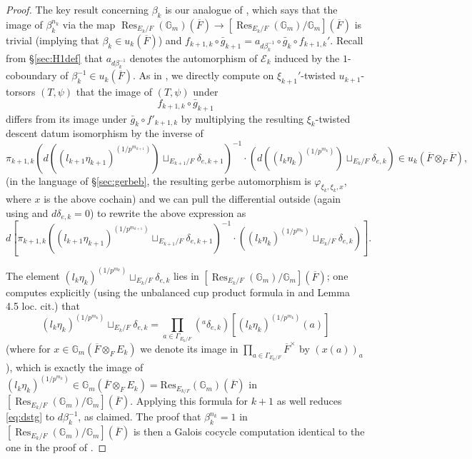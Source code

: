 \documentclass{amsart}
\theoremstyle{definition}
\theoremstyle{remark}
\DeclareMathOperator\Res{Res}
\newcommand{\ov}{\overline}
\begin{document}
\begin{proof}
The key result concerning $\beta_{k}$ is our analogue of \cite[Lemma 5.9]{Kal26b}, which says that the image of $\beta_{k}^{n_{k}}$ via the map $\Res_{E_{k}/F}(\mathbb{G}_{m})(\ov{F}) \to [\Res_{E_{k}/F}(\mathbb{G}_{m})/\mathbb{G}_{m}](\ov{F})$ is trivial (implying that $\beta_{k} \in u_{k}(\ov{F})$) and $f_{k+1,k} \circ \bar{g}_{k+1} = a_{d\beta_{k}^{-1}} \circ \bar{g}_{k} \circ f_{k+1,k}'$. Recall from \S \ref{sec:H1def} that $a_{d\beta_{k}^{-1}}$ denotes the automorphism of $\mathcal{E}_{k}$ induced by the $1$-coboundary of $\beta_{k}^{-1} \in u_{k}(\ov{F})$. As in \cite{Kal26b}, we directly compute on $\xi_{k+1}'$-twisted $u_{k+1}$-torsors $(T,\psi)$ that the image of $(T,\psi)$ under
\begin{equation*}
    f_{k+1,k} \circ \bar{g}_{k+1}
\end{equation*}
differs from its image under $\bar{g}_{k} \circ f'_{k+1,k}$ by multiplying the resulting $\xi_{k}$-twisted descent datum isomorphism by the inverse of
\begin{equation*}
\pi_{k+1,k}(d((l_{k+1}\eta_{k+1})^{(1/p^{m_{k+1}})}) \sqcup_{E_{k+1}/F} \delta_{e,k+1})^{-1} \cdot (d((l_{k}\eta_{k})^{(1/p^{m_{k}})}) \sqcup_{E_{k}/F} \delta_{e,k}) \in u_{k}(\ov{F} \otimes_{F} \ov{F}),
\end{equation*}
(in the language of \S \ref{sec:gerbeb}, the resulting gerbe automorphism is $\varphi_{\xi_{k},\xi_{k},x}$, where $x$ is the above cochain) and we can pull the differential outside (again using \cite[Proposition 4.4]{Dillery1} and $d\delta_{e,k}=0$) to rewrite the above expression as
\begin{equation}\label{eq:dstg}
d[\pi_{k+1,k}((l_{k+1}\eta_{k+1})^{(1/p^{m_{k+1}})} \sqcup_{E_{k+1}/F} \delta_{e,k+1})^{-1} \cdot ((l_{k}\eta_{k})^{(1/p^{m_{k}})} \sqcup_{E_{k}/F} \delta_{e,k})].
\end{equation}

The element $(l_{k}\eta_{k})^{(1/p^{m_{k}})} \sqcup_{E_{k}/F} \delta_{e,k}$ lies in $[\Res_{E_{k}/F}(\mathbb{G}_{m})/\mathbb{G}_{m}](\ov{F})$; one computes explicitly (using the unbalanced cup product formula in \cite[\S 4.2]{Dillery1} and Lemma 4.5 loc. cit.) that 
\begin{equation*}
    (l_{k}\eta_{k})^{(1/p^{m_{k}})} \sqcup_{E_{k}/F} \delta_{e,k} = \prod_{a \in \Gamma_{E_{k}/F}} ({^{a}\delta}_{e,k})[(l_{k}\eta_{k})^{(1/p^{m_{k}})}(a)]
\end{equation*}
(where for $x \in \mathbb{G}_{m}(\ov{F} \otimes_{F} E_{k})$ we denote its image in $\prod_{a \in \Gamma_{E_{k}/F}} \ov{F}^{\times}$ by $(x(a))_{a}$), which is exactly the image of $(l_{k}\eta_{k})^{(1/p^{m_{k}})} \in \mathbb{G}_{m}(\ov{F} \otimes_{F} E_{k}) = \mathrm{Res}_{E_{k/F}}(\mathbb{G}_{m})(\ov{F})$ in $[\Res_{E_{k}/F}(\mathbb{G}_{m})/\mathbb{G}_{m}](\ov{F})$. Applying this formula for $k+1$ as well reduces \eqref{eq:dstg} to $d\beta_{k}^{-1}$, as claimed. The proof that $\beta_{k}^{n_{k}}=1$ in $[\Res_{E_{k}/F}(\mathbb{G}_{m})/\mathbb{G}_{m}](\ov{F})$ is then a Galois cocycle computation identical to the one in the proof of \cite[Lemma 5.9]{Kal26b}.


\end{proof}
\end{document}
